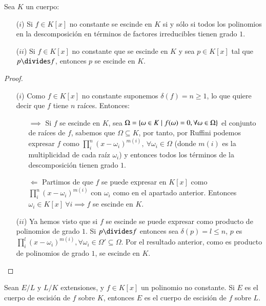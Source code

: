 \begin{lm}\label{lm:3.1}
    Sea $K$ un cuerpo:\\
    \begin{enumerate}
        \item[($i$)] Si $f \in K[x]$ no constante se escinde en $K$ si y sólo si todos los polinomios en la descomposición en términos de factores irreducibles tienen grado $1$.
        \item[($ii$)] Si $f \in K[x]$ no constante que se escinde en $K$ y sea $p \in K[x]$ tal que $p \divides f$, entonces $p$ se escinde en $K$.
    \end{enumerate}
\end{lm}

\begin{proof}$ $
    \begin{enumerate}
        \item[($i$)] Como $f \in K[x]$ no constante suponemos $\delta(f) = n \geq 1$, lo que quiere decir que $f$ tiene $n$ raíces. Entonces:
        \begin{itemize}
            \item[$\implies$] Si $f$ se escinde en $K$, sea $\Omega = \left\{\omega \in K \mid f(\omega) = 0, \forall \omega \in \Omega\right\}$ el conjunto de raíces de $f$, sabemos que $\Omega \subseteq K$, por tanto, por Ruffini podemos expresar $f$ como $\prod_i^n (x-\omega_i)^{m(i)},\ \forall \omega_i \in \Omega$ (donde $m(i)$ es la multiplicidad de cada raíz $\omega_i$) y entonces todos los términos de la descomposición tienen grado $1$.
            \item[$\Longleftarrow$] Partimos de que $f$ se puede expresar en $K[x]$ como $\prod_i^n (x-\omega_i)^{m(i)}$ con $\omega_i$ como en el apartado anterior. Entonces $\omega_i \in K[x]\ \forall i \implies f$ se escinde en $K$.
        \end{itemize}
        \item[($ii$)] Ya hemos visto que si $f$ se escinde se puede expresar como producto de polinomios de grado $1$. Si $p \divides f$ entonces sea $\delta(p) = l \leq n$, $p$ es $\prod_i^l (x-\omega_i)^{m(i)}, \forall \omega_i \in \Omega' \subseteq \Omega$. Por el resultado anterior, como es producto de polinomios de grado $1$, se escinde en $K$.
    \end{enumerate}
\end{proof}

\begin{lm}\label{lm:3.2}
    Sean $E/L$ y $L/K$ extensiones, y $f \in K[x]$ un polinomio no constante. Si $E$ es el cuerpo de escisión de $f$ sobre $K$, entonces $E$ es el cuerpo de escisión de $f$ sobre $L$.
\end{lm}

